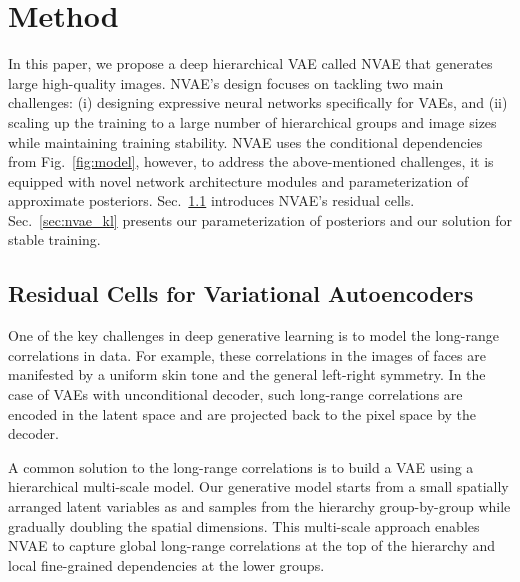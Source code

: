 \documentclass{article}
\begin{document}
 \section{Method}\label{sec:method}
In this paper, we propose a deep hierarchical VAE called NVAE that generates large high-quality images. NVAE's design focuses on tackling two main challenges: (i) designing expressive neural networks specifically for VAEs, and (ii) scaling up the training to a large number of hierarchical groups and image sizes while maintaining training stability. NVAE uses the conditional dependencies from Fig.~\ref{fig:model}, however, to address the above-mentioned challenges, it is equipped with novel network architecture modules and parameterization of approximate posteriors. Sec.~\ref{sec:nvae_net} introduces NVAE's residual cells. Sec.~\ref{sec:nvae_kl} presents our parameterization of posteriors and our solution for stable training.


\subsection{Residual Cells for Variational Autoencoders}\label{sec:nvae_net}
One of the key challenges in deep generative learning is to model the long-range correlations in data. For example, these correlations in the images of faces are manifested by a uniform skin tone and the general left-right symmetry. In the case of VAEs with unconditional decoder, such long-range correlations are encoded in the latent space and are projected back to the pixel space by the decoder. 

A common solution to the long-range correlations is to build a VAE using a hierarchical multi-scale model. Our generative model starts from a small spatially arranged latent variables as  and samples from the hierarchy group-by-group while gradually doubling the spatial dimensions. This multi-scale approach enables NVAE to capture global long-range correlations at the top of the hierarchy and local fine-grained dependencies at the lower groups.
\end{document}
